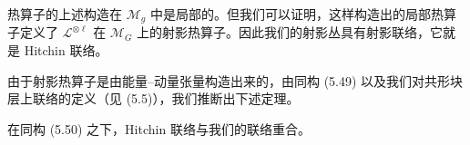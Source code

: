 
热算子的上述构造在 $\mathcal M_g$ 中是局部的。但我们可以证明，这样构造出的局部热算子定义了 $\mathcal L^{\otimes\ell}$ 在 $\mathcal M_G$ 上的射影热算子。因此我们的射影丛具有射影联络，它就是 Hitchin 联络。

由于射影热算子是由能量–动量张量构造出来的，由同构 (5.49) 以及我们对共形块层上联络的定义（见 (5.5)），我们推断出下述定理。

\begin{theorem}[5.32]
在同构 (5.50) 之下，Hitchin 联络与我们的联络重合。
\end{theorem}
